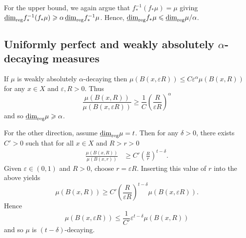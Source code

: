 For the upper bound, we again argue that $f_*^{-1}(f_*\mu) = \mu$ giving $\underline{\dim}_{\textup{reg}} f_*^{-1}(f_* \mu) \geqslant \alpha \, \underline{\dim}_{\textup{reg}} f_*^{-1} \mu$. Hence, $\underline{\dim}_{\textup{reg}} f_* \mu \leqslant \underline{\dim}_{\textup{reg}} \mu / \alpha$.











\subsection{Uniformly perfect and weakly absolutely $\alpha$-decaying measures}\label{ch-quantifying:diophantine-proof}



	If $\mu$ is weakly absolutely $\alpha$-decaying then $\mu(B(x,\varepsilon R)) \le C \varepsilon^{\alpha} \mu(B(x,R))$ for any $x\in X$ and $\varepsilon, R >0$. Thus
	\[
	\frac{\mu(B(x,R))}{\mu(B(x,\varepsilon R))} \ge \frac{1}{C} \left(\frac{R}{\varepsilon R} \right)^{\alpha}
	\]
	and so $\underline{\dim}_{\textup{reg}} \mu \geqslant \alpha$.
	
	For the other direction, assume $\underline{\dim}_{\textup{reg}} \mu = t$. Then for any $\delta > 0$, there exists $C' > 0$ such that for all $x\in X$ and $R>r>0$ 
	\begin{align*}
	\frac{\mu(B(x,R))}{\mu(B(x,r))} &\ge C' \left( \frac{R}{r}\right)^{t - \delta}.
	\end{align*}
	Given $\varepsilon \in (0,1)$ and $R > 0$, choose $r = \varepsilon R$. Inserting this value of $r$ into the above yields 
	\[\mu(B(x,R)) \ge C' \left(\frac{R}{\varepsilon R}\right)^{t-\delta} \mu(B(x,\varepsilon R)).
	\]
	Hence
	\[
	\mu(B(x,\varepsilon R)) \le \frac{1}{C'} \varepsilon^{t - \delta} \mu(B(x,R))  
	\]
	and so $\mu$ is $(t-\delta)$-decaying.




